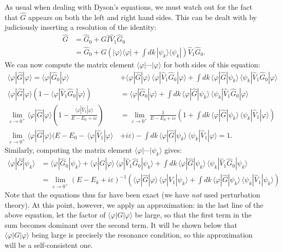 \documentclass[pra,12pt]{revtex4}
\begin{document}
As usual when dealing with Dyson's equations, we must watch out for
the fact that $\hat{G}$ appears on both the left and right hand sides.
This can be dealt with by judiciously inserting a resolution of the
identity:
$$\begin{aligned}\hat{G} &= \hat{G}_0 + \hat{G} \hat{I} \hat{V}_1 \hat{G}_0 \\ &= \hat{G}_0 + \hat{G} \left(|\varphi\rangle\langle\varphi| + \int dk\, |\psi_k\rangle\langle\psi_k|\right) \hat{V}_1 \hat{G}_0. \end{aligned}$$
We can now compute the matrix element
$\langle\varphi|\cdots|\varphi\rangle$ for both sides of this equation:
$$\begin{aligned}\langle\varphi|\hat{G}|\varphi\rangle = \langle\varphi|\hat{G}_0|\varphi\rangle &+ \langle\varphi|\hat{G}|\varphi\rangle \, \langle\varphi|\hat{V}_1 \hat{G}_0|\varphi\rangle + \int dk\, \langle\varphi|\hat{G}|\psi_k\rangle \, \langle\psi_k| \hat{V}_1 \hat{G}_0|\varphi\rangle \\
\langle\varphi|\hat{G}|\varphi\rangle \left(1 - \langle\varphi|\hat{V}_1 \hat{G}_0|\varphi\rangle\right) &= \langle\varphi|\hat{G}_0|\varphi\rangle + \int dk\, \langle\varphi|\hat{G}|\psi_k\rangle \, \langle\psi_k| \hat{V}_1 \hat{G}_0|\varphi\rangle \\ \lim_{\varepsilon\rightarrow0^+}
\langle\varphi|\hat{G}|\varphi\rangle \left(1 - \frac{\langle\varphi|\hat{V}_1|\varphi\rangle}{E - E_0 + i\varepsilon}\right) &= \lim_{\varepsilon\rightarrow0^+} \frac{1}{E  - E_0 + i\varepsilon} \left(1+ \int dk\, \langle\varphi|\hat{G}|\psi_k\rangle \, \langle\psi_k| \hat{V}_1|\varphi\rangle \right) \\
\lim_{\varepsilon\rightarrow0^+} \langle\varphi|\hat{G}|\varphi\rangle \Big(E - E_0 -\, \langle\varphi|\hat{V}_1|\varphi\rangle \, & + i\varepsilon\Big) - \int dk\, \langle\varphi|\hat{G}|\psi_k\rangle \, \langle\psi_k| \hat{V}_1|\varphi\rangle = 1.\end{aligned}$$
Similarly, computing the matrix element
$\langle\varphi|\cdots|\psi_k\rangle$ gives:
$$\begin{aligned}
\langle\varphi|\hat{G}|\psi_k\rangle &= \langle\varphi|\hat{G}_0|\psi_k\rangle + \langle\varphi|\hat{G}|\varphi\rangle \, \langle\varphi|\hat{V}_1 \hat{G}_0|\psi_k\rangle + \int dk\, \langle\varphi|\hat{G}|\psi_k\rangle \, \langle\psi_k| \hat{V}_1 \hat{G}_0|\psi_k\rangle \\
&= \lim_{\varepsilon\rightarrow0^+} \left(E-E_k+i\varepsilon\right)^{-1} \left(\langle\varphi|\hat{G}|\varphi\rangle \, \langle\varphi|\hat{V}_1|\psi_k\rangle + \int dk\, \langle\varphi|\hat{G}|\psi_k\rangle \, \langle\psi_k| \hat{V}_1|\psi_k\rangle\right)\end{aligned}$$
Note that the equations thus far have been exact (we have \textit{not}
used perturbation theory).  At this point, however, we apply an
approximation: in the last line of the above equation, let the factor
of $\langle\varphi|G|\varphi\rangle$ be large, so that the first term
in the sum becomes dominant over the second term.  It will be shown
below that $\langle\varphi|G|\varphi\rangle$ being large is precisely
the resonance condition, so this approximation will be a
self-consistent one.
\end{document}
